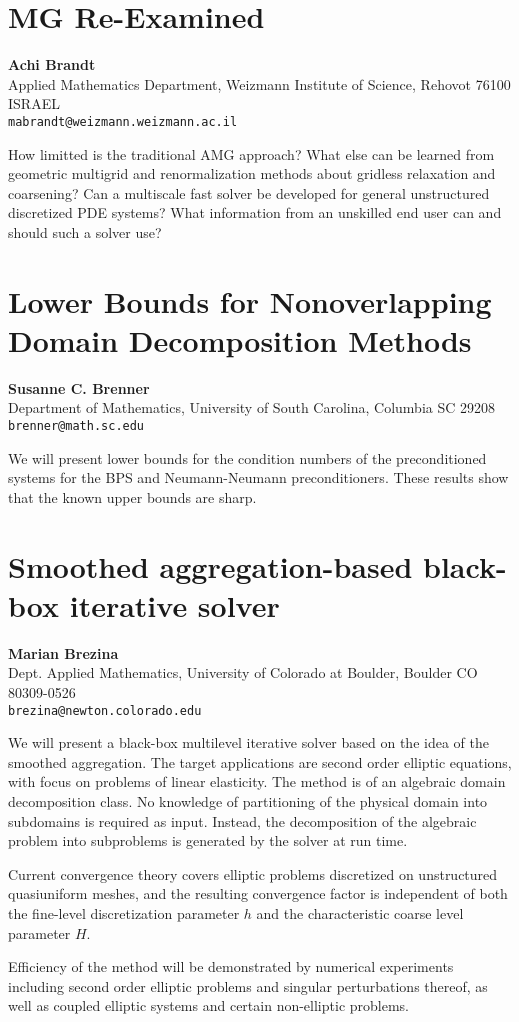 \documentclass[11pt]{article}
\newcommand{\nextab}[4]{
	\section{#2}
	{\bf #1} \\ \nopagebreak
	{#3} \\ \nopagebreak
	{\tt #4} \nopagebreak
	}
\begin{document}

\nextab{Achi Brandt}
	{MG Re-Examined}
	{Applied Mathematics Department,
		Weizmann Institute of Science,
		Rehovot 76100 ISRAEL}
	{mabrandt@weizmann.weizmann.ac.il}

How limitted is the traditional AMG approach? What else can be
learned from geometric multigrid and renormalization methods about
gridless relaxation and coarsening? Can a multiscale fast solver
be developed for general unstructured discretized PDE systems? What
information from an unskilled end user can and should such a solver use?


\pagebreak


\nextab{Susanne C. Brenner}
	{Lower Bounds for Nonoverlapping Domain Decomposition Methods}
	{Department of Mathematics, University of South Carolina,
		Columbia SC 29208}
	{brenner@math.sc.edu}

We will present lower bounds for the condition numbers of the
preconditioned systems for the BPS and Neumann-Neumann
preconditioners. These results show that the known upper bounds
are sharp.





\nextab{Marian Brezina}
	{Smoothed aggregation-based black-box iterative solver}
	{Dept. Applied Mathematics, University of Colorado at Boulder,
		Boulder CO 80309-0526}
	{brezina@newton.colorado.edu}

We will present a black-box multilevel iterative solver based on the
idea of the smoothed aggregation. The target applications
are second order elliptic equations, with focus on problems of linear
elasticity.
The method is of an algebraic domain decomposition class.
No knowledge of partitioning of the physical domain into subdomains
is required as input. Instead, the decomposition of the algebraic problem
into subproblems is generated by the solver at run time.

Current convergence theory covers elliptic problems
discretized on unstructured quasiuniform meshes,
and the resulting convergence factor is independent of
both the fine-level discretization parameter $h$
and the characteristic coarse level parameter $H$.

Efficiency of the method will be demonstrated by numerical experiments
including second order elliptic problems and singular perturbations thereof,
as well as coupled elliptic systems and certain non-elliptic problems.
\end{document}
